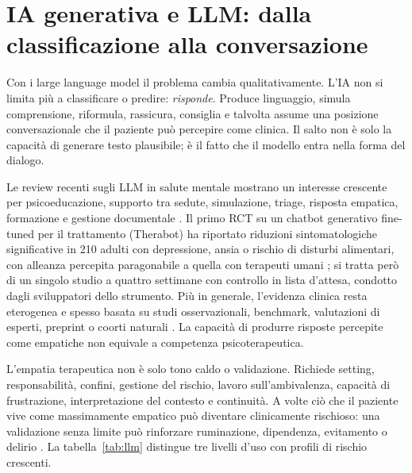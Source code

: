 \documentclass[11pt,a4paper]{article}
\begin{document}
\section{IA generativa e LLM: dalla classificazione alla conversazione}
\label{sec:llm}

Con i large language model il problema cambia qualitativamente. L'IA non si limita più a classificare o predire: \emph{risponde}. Produce linguaggio, simula comprensione, riformula, rassicura, consiglia e talvolta assume una posizione conversazionale che il paziente può percepire come clinica. Il salto non è solo la capacità di generare testo plausibile; è il fatto che il modello entra nella forma del dialogo.

Le review recenti sugli LLM in salute mentale mostrano un interesse crescente per psicoeducazione, supporto tra sedute, simulazione, triage, risposta empatica, formazione e gestione documentale \cite{hua2025,guo2024}. Il primo RCT su un chatbot generativo fine-tuned per il trattamento (Therabot) ha riportato riduzioni sintomatologiche significative in 210 adulti con depressione, ansia o rischio di disturbi alimentari, con alleanza percepita paragonabile a quella con terapeuti umani \cite{heinz2025}; si tratta però di un singolo studio a quattro settimane con controllo in lista d'attesa, condotto dagli sviluppatori dello strumento. Più in generale, l'evidenza clinica resta eterogenea e spesso basata su studi osservazionali, benchmark, valutazioni di esperti, preprint o coorti naturali \cite{li2023}. La capacità di produrre risposte percepite come empatiche \cite{lee2024,welivita2024} non equivale a competenza psicoterapeutica.

L'empatia terapeutica non è solo tono caldo o validazione. Richiede setting, responsabilità, confini, gestione del rischio, lavoro sull'ambivalenza, capacità di frustrazione, interpretazione del contesto e continuità. A volte ciò che il paziente vive come massimamente empatico può diventare clinicamente rischioso: una validazione senza limite può rinforzare ruminazione, dipendenza, evitamento o delirio \cite{grabb2024,dohnany2025}. La tabella~\ref{tab:llm} distingue tre livelli d'uso con profili di rischio crescenti.
\end{document}
